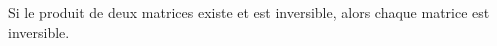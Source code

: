 Si le produit de deux matrices existe et est inversible, alors chaque matrice est inversible.

\begin{reponses}
\end{reponses}

\begin{comment}
Le produit de deux matrices non carrées peut être carré.
\end{comment}

